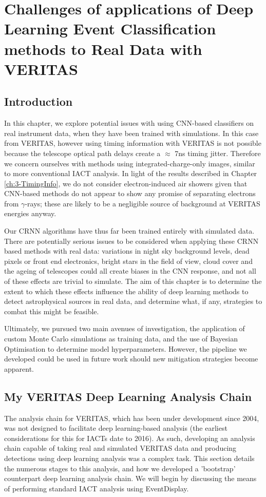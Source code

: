 \chapter{\label{ch:4-VERITASRealData} Challenges of applications of Deep Learning Event Classification methods to Real Data with VERITAS}
\minitoc
\section{Introduction}

In this chapter, we explore potential issues with using CNN-based classifiers on real instrument data, when they have been trained with simulations. In this case from VERITAS, however using timing information with VERITAS is not possible because the telescope optical path delays create a $\approx$ 7ns timing jitter. Therefore we concern ourselves with methods using integrated-charge-only images, similar to more conventional IACT analysis. In light of the results described in Chapter \ref{ch:3-TimingInfo}, we do not consider electron-induced air showers given that CNN-based methods do not appear to show any promise of separating electrons from $\gamma$-rays; these are likely to be a negligible source of background at VERITAS energies anyway.

Our CRNN algorithms have thus far been trained entirely with simulated data.  There are potentially serious issues to be considered when applying these CRNN based methods with real data: variations in night sky background levels, dead pixels or front end electronics, bright stars in the field of view, cloud cover and the ageing of telescopes could all create biases in the CNN response, and not all of these effects are trivial to simulate. The aim of this chapter is to determine the extent to which these effects influence the ability of deep learning methods to detect astrophysical sources in real data, and determine what, if any, strategies to combat this might be feasible. 

Ultimately, we pursued two main avenues of investigation, the application of custom Monte Carlo simulations as training data, and the use of Bayesian Optimisation to determine model hyperparameters. However, the pipeline we developed could be used in future work should new mitigation strategies become apparent.

\section{My VERITAS Deep Learning Analysis Chain}
The analysis chain for VERITAS, which has been under development since 2004, was not designed to facilitate deep learning-based analysis (the earliest considerations for this for IACTs date to 2016). As such, developing an analysis chain capable of taking real and simulated VERITAS data and producing detections using deep learning analysis was a complex task. This section details the numerous stages to this analysis, and how we developed a 'bootstrap' counterpart deep learning analysis chain. We will begin by discussing the means of performing standard IACT analysis using EventDisplay.

